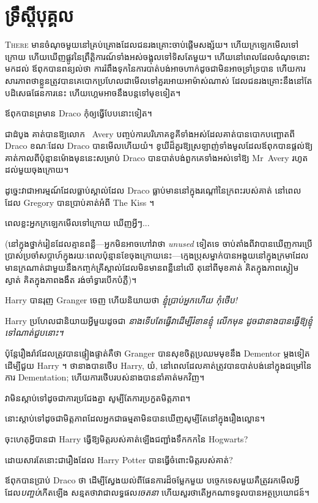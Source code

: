 \chapter{ទ្រឹស្តីបុគ្គល}

\lettrine{T}{here} មានចំណុចមួយនៅគ្រប់គ្រោងដែលជនរងគ្រោះចាប់ផ្តើមសង្ស័យ។ ហើយក្រឡេកមើលទៅក្រោយ ហើយឃើញផ្លូវនៃព្រឹត្តិការណ៍ទាំងអស់ចង្អុលទៅទិសតែមួយ។ ហើយនៅពេលដែលចំណុចនោះមកដល់ ឪពុកបានពន្យល់ថា ការរំពឹងទុកនៃការបាត់បង់អាចហាក់ដូចជាមិនអាចទ្រាំទ្របាន ហើយការសារភាពថាខ្លួនត្រូវបានគេបោកប្រហែលជាមើលទៅគួរអោយអាម៉ាស់ណាស់ ដែលជនរងគ្រោះនឹងនៅតែបដិសេធផែនការនេះ ហើយហ្គេមអាចនឹងបន្តទៅមុខទៀត។

ឪពុក​បាន​ព្រមាន Draco កុំ​ឲ្យ​ធ្វើ​បែប​នោះ​ទៀត​។

ជាដំបូង គាត់បានឱ្យលោក ~Avery បញ្ចប់ការបរិភោគខូគីទាំងអស់ដែលគាត់បានបោកបញ្ឆោតពី Draco ខណៈដែល Draco បានមើលហើយយំ។ ខូឃីដ៏គួរឱ្យស្រឡាញ់ទាំងមូលដែលឪពុកបានផ្តល់ឱ្យគាត់កាលពីប៉ុន្មានម៉ោងមុននេះសម្រាប់ Draco បានបាត់បង់ពួកគេទាំងអស់ទៅឱ្យ Mr~Avery រហូតដល់មួយចុងក្រោយ។

ដូច្នេះវាជាអារម្មណ៍ដែលធ្លាប់ស្គាល់ដែល Draco ធ្លាប់មាននៅក្នុងរណ្តៅនៃក្រពះរបស់គាត់ នៅពេលដែល Gregory បានប្រាប់គាត់អំពី The Kiss ។

ពេលខ្លះអ្នកក្រឡេកមើលទៅក្រោយ ឃើញអ្វីៗ...

(នៅក្នុងថ្នាក់រៀនដែលគ្មានពន្លឺ—អ្នកមិនអាចហៅវាថា \emph{unused} ទៀតទេ ចាប់តាំងពីវាបានឃើញការប្រើប្រាស់ប្រចាំសប្តាហ៍ក្នុងរយៈពេលប៉ុន្មានខែចុងក្រោយនេះ—ក្មេងប្រុសម្នាក់បានអង្គុយនៅក្នុងក្រមាដែលមានក្រណាត់ជាមួយនឹងកញ្ចក់គ្រីស្តាល់ដែលមិនមានពន្លឺនៅលើ តុនៅពីមុខគាត់ គិតក្នុងភាពស្ងៀមស្ងាត់ គិតក្នុងភាពងងឹត រង់ចាំទ្វារបើកបំភ្លឺ)។

Harry បានរុញ Granger ចេញ ហើយនិយាយថា \emph{ខ្ញុំប្រាប់អ្នកហើយ កុំថើប!}

Harry ប្រហែលជានិយាយអ្វីមួយដូចជា \emph{នាងទើបតែធ្វើវាដើម្បីរំខានខ្ញុំ លើកមុន ដូចជានាងបានធ្វើឱ្យខ្ញុំទៅណាត់ជួបនោះ។}

ប៉ុន្តែរឿងរ៉ាវដែលត្រូវបានផ្ទៀងផ្ទាត់គឺថា Granger បានសុខចិត្តប្រឈមមុខនឹង Dementor ម្តងទៀតដើម្បីជួយ Harry ។ ថានាងបានថើប Harry, យំ, នៅពេលដែលគាត់ត្រូវបានបាត់បង់នៅក្នុងជម្រៅនៃការ Dementation; ហើយការថើបរបស់នាងបាននាំគាត់មកវិញ។

វាមិនស្តាប់ទៅដូចជាការប្រជែងគ្នា សូម្បីតែការប្រកួតមិត្តភាព។

នោះស្តាប់ទៅដូចជាមិត្តភាពដែលអ្នកជាធម្មតាមិនបានឃើញសូម្បីតែនៅក្នុងរឿងល្ខោន។

ចុះហេតុអ្វីបានជា Harry ធ្វើឱ្យមិត្តរបស់គាត់ឡើងជញ្ជាំងទឹកកកនៃ Hogwarts?

ដោយសារតែនោះជារឿងដែល Harry Potter បានធ្វើចំពោះមិត្តរបស់គាត់?

ឪពុកបានប្រាប់ Draco ថា ដើម្បីស្វែងយល់ពីផែនការដ៏ចម្លែកមួយ បច្ចេកទេសមួយគឺត្រូវរកមើលអ្វីដែល\emph{បញ្ចប់}កើតឡើង សន្មតថាវាជាលទ្ធផល\emph{ចេតនា} ហើយសួរថាតើអ្នកណាទទួលបានអត្ថប្រយោជន៍។


